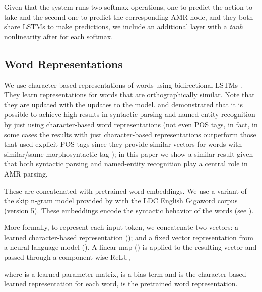 \documentclass[11pt,a4paper]{article}
\begin{document}
Given that the system runs two softmax operations, one to predict the action to take and the second one 
to predict the corresponding AMR node, and they both share LSTMs to make predictions, we include 
an additional layer with a \emph{tanh} nonlinearity after  for 
each softmax. 


\subsection{Word Representations}

We use character-based representations
 of words using bidirectional LSTMs \cite{ling:2015,ballesteros-dyer-smith:2015:EMNLP}. They
  learn  representations for words that are orthographically similar. Note that they are updated with 
  the updates to the model.
   and   demonstrated 
   that it is possible to achieve high results in syntactic
  parsing and named entity recognition by just using character-based word representations 
  (not even POS tags, in fact, in some cases the results with just character-based representations
  outperform those that used explicit POS tags since they provide similar vectors for words with 
  similar/same morphosyntactic tag \cite{ballesteros-dyer-smith:2015:EMNLP});  in this paper we show 
  a similar result given that both syntactic parsing and named-entity recognition play a central role in AMR 
  parsing. 

 These are concatenated with pretrained word  embeddings. We use a variant of the skip n-gram model 
 provided by   with the LDC English Gigaword corpus (version 5). 
 These embeddings encode the syntactic behavior of the words (see 
 \cite{Ling:2015:naacl}).
 
 More formally, to represent each input token, we concatenate two vectors: a learned
 character-based representation (); and a 
fixed vector representation from a neural language model ().
A linear map () is applied to the resulting vector and passed through a component-wise ReLU,

where  is a learned parameter matrix,  is a bias term and 
is the character-based learned representation for each word,  is the 
pretrained word representation.
\end{document}
